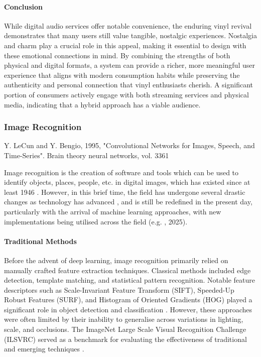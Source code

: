             \paragraph{Conclusion}
                While digital audio services offer notable convenience, the enduring vinyl revival demonstrates that many users still value tangible, nostalgic experiences. Nostalgia and charm play a crucial role in this appeal, making it essential to design with these emotional connections in mind. By combining the strengths of both physical and digital formats, a system can provide a richer, more meaningful user experience that aligns with modern consumption habits while preserving the authenticity and personal connection that vinyl enthusiasts cherish. A significant portion of consumers actively engage with both streaming services and physical media, indicating that a hybrid approach has a viable audience.
    
        \subsubsection{Image Recognition}
    
            \begin{temp}
                Y. LeCun and Y. Bengio, 1995, "Convolutional Networks for Images, Speech, and Time-Series". Brain theory neural networks, vol. 3361
            \end{temp}
    
            Image recognition is the creation of software and tools which can be used to identify objects, places, people, etc. in digital images, which has existed since at least 1946 \cite{hall1979computer}. However, in this brief time, the field has undergone several drastic changes as technology has advanced \cite{imagenetclasscnn}, and is still be redefined in the present day, particularly with the arrival of machine learning approaches, with new implementations being utilised across the field (e.g. \cite{RAMPRASAD2025100556}, 2025).
    
            \paragraph{Traditional Methods}
            
                Before the advent of deep learning, image recognition primarily relied on manually crafted feature extraction techniques. Classical methods included edge detection, template matching, and statistical pattern recognition. Notable feature descriptors such as Scale-Invariant Feature Transform (SIFT), Speeded-Up Robust Features (SURF), and Histogram of Oriented Gradients (HOG) played a significant role in object detection and classification \cite{pal2001pattern}. However, these approaches were often limited by their inability to generalise across variations in lighting, scale, and occlusions. The ImageNet Large Scale Visual Recognition Challenge (ILSVRC) served as a benchmark for evaluating the effectiveness of traditional and emerging techniques \cite{russakovsky2015imagenetlargescalevisual}.
            
